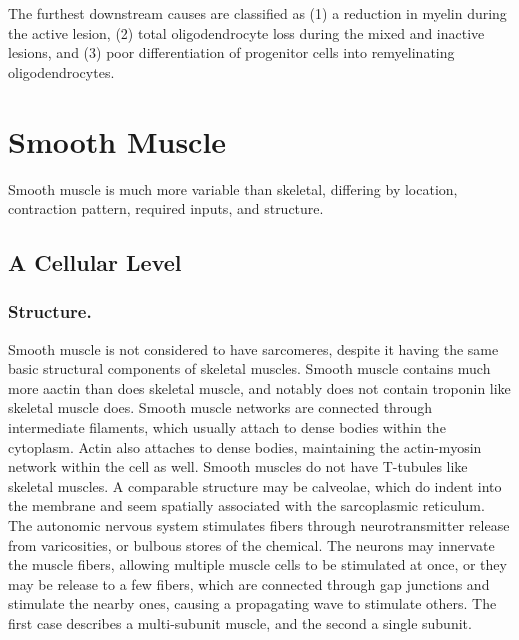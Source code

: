 \documentclass[12pt]{report}
\begin{document}
The furthest downstream causes are classified as (1) a reduction in myelin during the active lesion, (2) total oligodendrocyte loss during the mixed and inactive lesions, and (3) poor differentiation of progenitor cells into remyelinating oligodendrocytes. 



\section{Smooth Muscle}

Smooth muscle is much more variable than skeletal, differing by location, contraction pattern, required inputs, and structure. 


\subsection{A Cellular Level}
\subsubsection{Structure.}
Smooth muscle is not considered to have sarcomeres, despite it having the same basic structural components of skeletal muscles. Smooth muscle contains much more aactin than does skeletal muscle, and notably does not contain troponin like skeletal muscle does. Smooth muscle networks are connected through intermediate filaments, which usually attach to dense bodies within the cytoplasm. Actin also attaches to dense bodies, maintaining the actin-myosin network within the cell as well. Smooth muscles do not have T-tubules like skeletal muscles. A comparable structure may be calveolae, which do indent into the membrane and seem spatially associated with the sarcoplasmic reticulum. The autonomic nervous system stimulates fibers through neurotransmitter release from varicosities, or bulbous stores of the chemical. The neurons may innervate the muscle fibers, allowing multiple muscle cells to be stimulated at once, or they may be release to a few fibers, which are connected through gap junctions and stimulate the nearby ones, causing a propagating wave to stimulate others. The first case describes a multi-subunit muscle, and the second a single subunit. 
\end{document}
